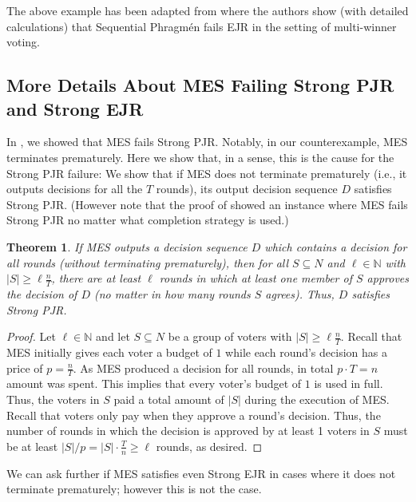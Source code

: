 \documentclass[10pt]{scrartcl}
\theoremstyle{plain}
\newtheorem{theorem}{Theorem}[section]
\theoremstyle{definition}
\renewcommand*{\ge}{\geqslant}
\begin{document}
The above example has been adapted from \cite[Example 6]{brill2023phragmen} where the authors show (with detailed calculations) that Sequential Phragm\'en fails EJR in the setting of multi-winner voting.

\fi 



\subsection[MES Fails Strong PJR and Strong EJR]{More Details About MES Failing Strong PJR and Strong EJR}
\label{app:mes-strong-axioms}

In , we showed that MES fails Strong PJR. Notably, in our counterexample, MES terminates prematurely. Here we show that, in a sense, this is the cause for the Strong PJR failure: We show that if MES does not terminate prematurely (i.e., it outputs decisions for all the $T$ rounds), its output decision sequence $D$ satisfies Strong PJR. (However note that the proof of   showed an instance where MES fails Strong PJR no matter what completion strategy is used.)


\begin{theorem}
    If MES outputs a decision sequence $D$ which contains a decision for all rounds (without terminating prematurely), then for all $S \subseteq N$ and $\ell \in \mathbb{N}$ with $|S| \ge \ell \frac{n}{T}$, there are at least $\ell$ rounds in which at least one member of $S$ approves the decision of $D$ (no matter in how many rounds $S$ agrees). Thus, $D$ satisfies Strong PJR.
\end{theorem}

\begin{proof}
    Let $\ell \in \mathbb{N}$ and let $S \subseteq N$ be a group of voters with $|S| \ge \ell \frac{n}{T}$.
Recall that MES initially gives each voter a budget of $1$ while each round's decision has a price of $p = \frac{n}{T}$. As MES produced a decision for all rounds, in total $p \cdot T = n$ amount was spent. This implies that every voter's budget of $1$ is used in full. Thus, the voters in $S$ paid a total amount of $|S|$ during the execution of MES. Recall that voters only pay when they approve a round's decision. Thus, the number of rounds in which the decision is approved by at least 1 voters in $S$ must be at least $|S|/p = |S| \cdot \frac{T}{n} \ge \ell$ rounds, as desired.
\end{proof}

We can ask further if MES satisfies even Strong EJR in cases where it does not terminate prematurely; however this is not the case.
\end{document}
